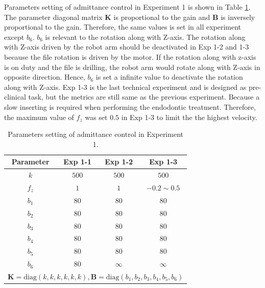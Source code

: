 \par
Parameters setting of admittance control in Experiment 1 is shown in Table \ref{tab: para_adm_exp1}. The parameter diagonal matrix $\mathbf{K}$ is proportional to the gain and $\mathbf{B}$ is inversely proportional to the gain. Therefore, the same values is set in all experiment except $b_6$. $b_6$ is relevant to the rotation along with Z-axis. The rotation along with Z-axis driven by the robot arm should be deactivated in Exp 1-2 and 1-3 because the file rotation is driven by the motor. If the rotation along with z-axis is on duty and the file is drilling, the robot arm would rotate along with Z-axis in opposite direction. Hence, $b_6$ is set a infinite value to deactivate the rotation along with Z-axis. Exp 1-3 is the last technical experiment and is designed as pre-clinical task, but the metrics are still same as the previous experiment. Because a slow inserting is required when performing the endodontic treatment. Therefore, the maximum value of $f_z$ was set $0.5$ in Exp 1-3 to limit the the highest velocity. 
\par
\begin{table}[htbp]
\centering
\tabcolsep=25pt
\caption{Parameters setting of admittance control in Experiment 1.}
\label{tab: para_adm_exp1}
\begin{tabular}{cccc} 
\hline \hline
Parameter	&Exp 1-1		&Exp 1-2		&Exp 1-3	\\
\hline
$k$			&$500$		&$500$		&$500$				\\
$f_z$		&$1$		&$1$		&$-0.2 \sim 0.5$	\\
$b_1$		&$80$		&$80$		&$80$				\\
$b_2$		&$80$		&$80$		&$80$				\\
$b_3$		&$80$		&$80$		&$80$				\\
$b_4$		&$80$		&$80$		&$80$				\\
$b_5$		&$80$		&$80$		&$80$				\\
$b_6$		&$80$		&$\infty$	&$\infty$			\\
\hline
\multicolumn{4}{c}{ $\mathbf{K} = \text{diag}(k,k,k,k,k,k), \mathbf{B} = \text{diag}(b_1,b_2,b_3,b_4,b_5,b_6)$} \\
\hline\hline	
\end{tabular}
\end{table}

